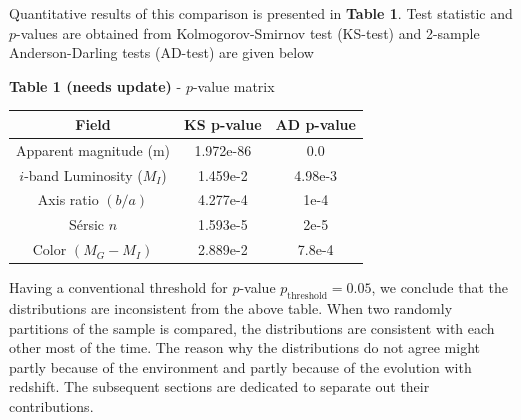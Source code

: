 \documentclass[twocolumn,useAMS,usenatbib]{mn2e}
\newcommand{\mi}{\ensuremath{M_I}}
\newcommand{\sersicn}{S\'{e}rsic $n$ }
\begin{document}
Quantitative results of this comparison is presented in {\bf Table 1}. Test statistic and $p$-values are obtained from Kolmogorov-Smirnov test (KS-test)
and 2-sample Anderson-Darling tests (AD-test) are given below


{\bf Table 1 (needs update) } - $p$-value matrix 
\begin{tabular}{||c|c|c||}
 \hline
  Field & KS p-value & AD p-value \\
 \hline 
  Apparent magnitude (m) & 1.972e-86 & 0.0 \\
  $i$-band Luminosity (\mi) & 1.459e-2 & 4.98e-3 \\
  Axis ratio $(b/a)$ & 4.277e-4 & 1e-4\\
  \sersicn & 1.593e-5 & 2e-5\\
  Color $(M_G-M_I)$ & 2.889e-2 & 7.8e-4\\
  
\end{tabular}

Having a conventional threshold for $p$-value $p_{\text{threshold}} = 0.05$, we conclude that the distributions are inconsistent from the above table.
When two randomly partitions of the sample is compared, the distributions are consistent with each other most of the time. The reason why the distributions
do not agree might partly because of the environment and partly because of the evolution with redshift. The subsequent sections are dedicated to separate out
their contributions.


\end{document}
